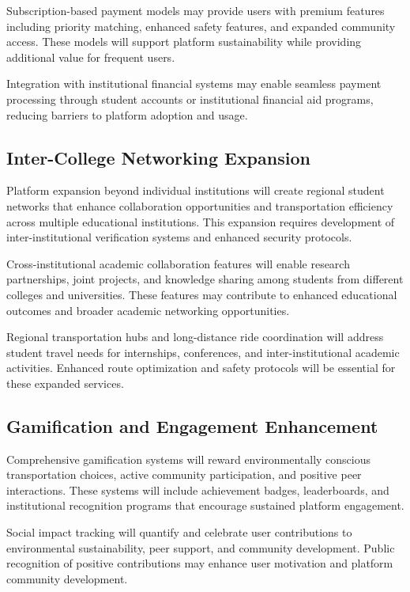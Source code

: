 \documentclass[conference]{IEEEtran}
\begin{document}
Subscription-based payment models may provide users with premium features including priority matching, enhanced safety features, and expanded community access. These models will support platform sustainability while providing additional value for frequent users.

Integration with institutional financial systems may enable seamless payment processing through student accounts or institutional financial aid programs, reducing barriers to platform adoption and usage.

\subsection{Inter-College Networking Expansion}

Platform expansion beyond individual institutions will create regional student networks that enhance collaboration opportunities and transportation efficiency across multiple educational institutions. This expansion requires development of inter-institutional verification systems and enhanced security protocols.

Cross-institutional academic collaboration features will enable research partnerships, joint projects, and knowledge sharing among students from different colleges and universities. These features may contribute to enhanced educational outcomes and broader academic networking opportunities.

Regional transportation hubs and long-distance ride coordination will address student travel needs for internships, conferences, and inter-institutional academic activities. Enhanced route optimization and safety protocols will be essential for these expanded services.

\subsection{Gamification and Engagement Enhancement}

Comprehensive gamification systems will reward environmentally conscious transportation choices, active community participation, and positive peer interactions. These systems will include achievement badges, leaderboards, and institutional recognition programs that encourage sustained platform engagement.

Social impact tracking will quantify and celebrate user contributions to environmental sustainability, peer support, and community development. Public recognition of positive contributions may enhance user motivation and platform community development.
\end{document}

